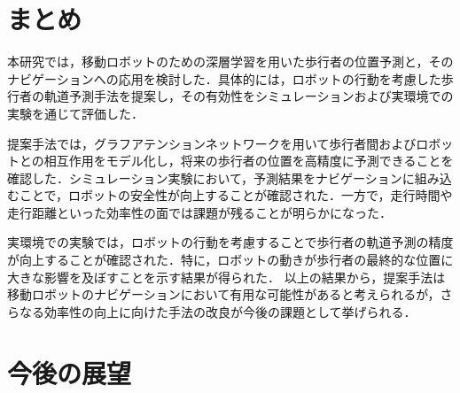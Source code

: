 
\section{まとめ}
本研究では，移動ロボットのための深層学習を用いた歩行者の位置予測と，そのナビゲーションへの応用を検討した．具体的には，ロボットの行動を考慮した歩行者の軌道予測手法を提案し，その有効性をシミュレーションおよび実環境での実験を通じて評価した．

提案手法では，グラフアテンションネットワークを用いて歩行者間およびロボットとの相互作用をモデル化し，将来の歩行者の位置を高精度に予測できることを確認した．シミュレーション実験において，予測結果をナビゲーションに組み込むことで，ロボットの安全性が向上することが確認された．一方で，走行時間や走行距離といった効率性の面では課題が残ることが明らかになった．

実環境での実験では，ロボットの行動を考慮することで歩行者の軌道予測の精度が向上することが確認された．特に，ロボットの動きが歩行者の最終的な位置に大きな影響を及ぼすことを示す結果が得られた．
以上の結果から，提案手法は移動ロボットのナビゲーションにおいて有用な可能性があると考えられるが，さらなる効率性の向上に向けた手法の改良が今後の課題として挙げられる．

\section{今後の展望}

\newpage